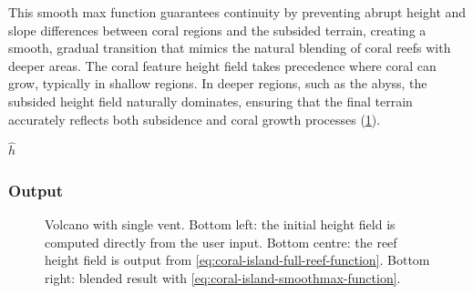This smooth max function guarantees continuity by preventing abrupt height and slope differences between coral regions and the subsided terrain, creating a smooth, gradual transition that mimics the natural blending of coral reefs with deeper areas. The coral feature height field takes precedence where coral can grow, typically in shallow regions. In deeper regions, such as the abyss, the subsided height field naturally dominates, ensuring that the final terrain accurately reflects both subsidence and coral growth processes (\cref{fig:coral-island-volcano-example}).


\begin{algorithm}[H]
    \caption{Subsidence, coral growth, and smooth blending.}
    \label{alg:subsidence-coral-blend}
    \DontPrintSemicolon
    \BlankLine




    \Return $\hat{h}$
\end{algorithm}

\subsubsection{Output}
\label{sec:coral-island-procedural-output}

\begin{figure}
    \caption[Volcano with coral reef generated using our curve-based method]{Volcano with single vent. Bottom left: the initial height field is computed directly from the user input. Bottom centre: the reef height field is output from \cref{eq:coral-island-full-reef-function}. Bottom right: blended result with \cref{eq:coral-island-smoothmax-function}.}
    \label{fig:coral-island-volcano-example}
\end{figure}

